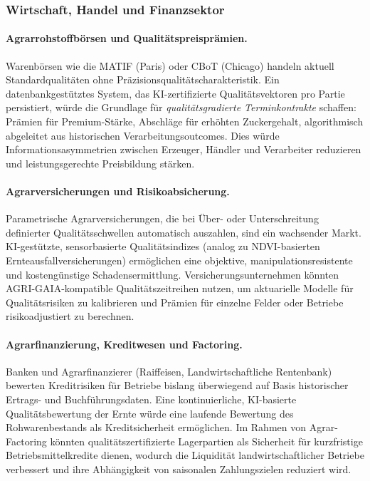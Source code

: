 \documentclass[a4paper, 12pt, twoside, openright]{report}
\theoremstyle{definition}
\theoremstyle{definition}
\begin{document}
\subsubsection{Wirtschaft, Handel und Finanzsektor}

\paragraph{Agrarrohstoffbörsen und Qualitätspreisprämien.}
Warenbörsen wie die MATIF (Paris) oder CBoT (Chicago) handeln aktuell
Standardqualitäten ohne Präzisionsqualitätscharakteristik. Ein
datenbankgestütztes System, das KI-zertifizierte Qualitätsvektoren
pro Partie persistiert, würde die Grundlage für \emph{qualitätsgradierte
Terminkontrakte} schaffen: Prämien für Premium-Stärke, Abschläge für
erhöhten Zuckergehalt, algorithmisch abgeleitet aus historischen
Verarbeitungsoutcomes. Dies würde Informationsasymmetrien zwischen
Erzeuger, Händler und Verarbeiter reduzieren und leistungsgerechte
Preisbildung stärken.

\paragraph{Agrarversicherungen und Risikoabsicherung.}
Parametrische Agrarversicherungen, die bei Über- oder Unterschreitung
definierter Qualitätsschwellen automatisch auszahlen, sind ein
wachsender Markt. KI-gestützte, sensorbasierte Qualitätsindizes
(analog zu NDVI-basierten Ernteausfallversicherungen) ermöglichen
eine objektive, manipulationsresistente und kostengünstige
Schadensermittlung. Versicherungsunternehmen könnten
AGRI-GAIA-kompatible Qualitätszeitreihen nutzen, um aktuarielle
Modelle für Qualitätsrisiken zu kalibrieren und Prämien
für einzelne Felder oder Betriebe risikoadjustiert zu berechnen.

\paragraph{Agrarfinanzierung, Kreditwesen und Factoring.}
Banken und Agrarfinanzierer (Raiffeisen, Landwirtschaftliche Rentenbank)
bewerten Kreditrisiken für Betriebe bislang überwiegend auf Basis
historischer Ertrags- und Buchführungsdaten. Eine kontinuierliche,
KI-basierte Qualitätsbewertung der Ernte würde eine laufende
Bewertung des Rohwarenbestands als Kreditsicherheit ermöglichen.
Im Rahmen von Agrar-Factoring könnten qualitätszertifizierte
Lagerpartien als Sicherheit für kurzfristige Betriebsmittelkredite
dienen, wodurch die Liquidität landwirtschaftlicher Betriebe
verbessert und ihre Abhängigkeit von saisonalen Zahlungszielen
reduziert wird.
\end{document}
